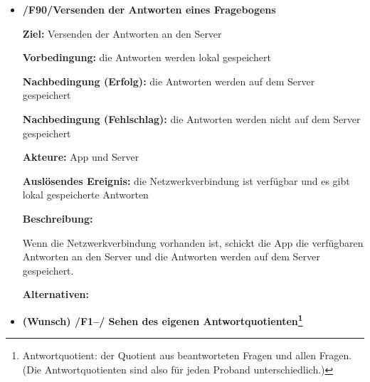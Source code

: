 \documentclass[a4paper]{scrreprt}
\begin{document}
\begin{itemize}
            \item \textbf{/F90/Versenden der Antworten eines Fragebogens}

            \par \textbf{Ziel: }Versenden der Antworten an den Server
            \par \textbf{Vorbedingung: }die Antworten werden lokal gespeichert
            \par \textbf{Nachbedingung (Erfolg): }die Antworten werden auf dem Server gespeichert
            \par \textbf{Nachbedingung (Fehlschlag): }die Antworten werden nicht auf dem Server gespeichert
            \par \textbf{Akteure: }App und Server
            \par \textbf{Auslösendes Ereignis: }die Netzwerkverbindung ist verfügbar und es gibt lokal gespeicherte Antworten
            \par \textbf{Beschreibung: }
            \par Wenn die Netzwerkverbindung vorhanden ist, schickt die App die verfügbaren Antworten an den Server und die Antworten werden auf dem Server gespeichert.
            \par \textbf{Alternativen: }
            
            
            \item \textbf{(Wunsch) /F1--/ Sehen des eigenen Antwortquotienten\footnote{Antwortquotient: der Quotient aus beantworteten Fragen und allen Fragen. (Die Antwortquotienten sind also für jeden Proband unterschiedlich.)}}
            

\end{itemize}
\end{document}
